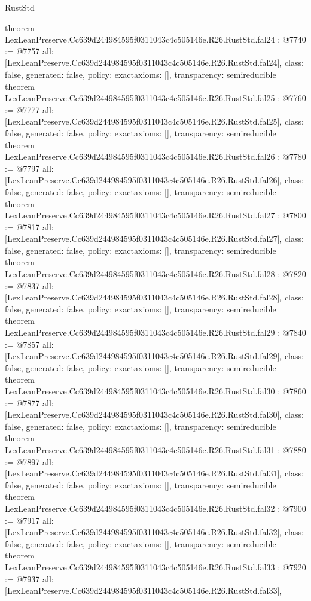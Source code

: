 \begin{lexlean}{RustStd}
\begin{coremodule}
{}
theorem LexLeanPreserve.Cc639d244984595f0311043c4c505146e.R26.RustStd.fal24 : @7740 := @7757 {
  all: [LexLeanPreserve.Cc639d244984595f0311043c4c505146e.R26.RustStd.fal24],
  class: false,
  generated: false,
  policy: exact{axioms: []},
  transparency: semireducible
}
theorem LexLeanPreserve.Cc639d244984595f0311043c4c505146e.R26.RustStd.fal25 : @7760 := @7777 {
  all: [LexLeanPreserve.Cc639d244984595f0311043c4c505146e.R26.RustStd.fal25],
  class: false,
  generated: false,
  policy: exact{axioms: []},
  transparency: semireducible
}
theorem LexLeanPreserve.Cc639d244984595f0311043c4c505146e.R26.RustStd.fal26 : @7780 := @7797 {
  all: [LexLeanPreserve.Cc639d244984595f0311043c4c505146e.R26.RustStd.fal26],
  class: false,
  generated: false,
  policy: exact{axioms: []},
  transparency: semireducible
}
theorem LexLeanPreserve.Cc639d244984595f0311043c4c505146e.R26.RustStd.fal27 : @7800 := @7817 {
  all: [LexLeanPreserve.Cc639d244984595f0311043c4c505146e.R26.RustStd.fal27],
  class: false,
  generated: false,
  policy: exact{axioms: []},
  transparency: semireducible
}
theorem LexLeanPreserve.Cc639d244984595f0311043c4c505146e.R26.RustStd.fal28 : @7820 := @7837 {
  all: [LexLeanPreserve.Cc639d244984595f0311043c4c505146e.R26.RustStd.fal28],
  class: false,
  generated: false,
  policy: exact{axioms: []},
  transparency: semireducible
}
theorem LexLeanPreserve.Cc639d244984595f0311043c4c505146e.R26.RustStd.fal29 : @7840 := @7857 {
  all: [LexLeanPreserve.Cc639d244984595f0311043c4c505146e.R26.RustStd.fal29],
  class: false,
  generated: false,
  policy: exact{axioms: []},
  transparency: semireducible
}
theorem LexLeanPreserve.Cc639d244984595f0311043c4c505146e.R26.RustStd.fal30 : @7860 := @7877 {
  all: [LexLeanPreserve.Cc639d244984595f0311043c4c505146e.R26.RustStd.fal30],
  class: false,
  generated: false,
  policy: exact{axioms: []},
  transparency: semireducible
}
theorem LexLeanPreserve.Cc639d244984595f0311043c4c505146e.R26.RustStd.fal31 : @7880 := @7897 {
  all: [LexLeanPreserve.Cc639d244984595f0311043c4c505146e.R26.RustStd.fal31],
  class: false,
  generated: false,
  policy: exact{axioms: []},
  transparency: semireducible
}
theorem LexLeanPreserve.Cc639d244984595f0311043c4c505146e.R26.RustStd.fal32 : @7900 := @7917 {
  all: [LexLeanPreserve.Cc639d244984595f0311043c4c505146e.R26.RustStd.fal32],
  class: false,
  generated: false,
  policy: exact{axioms: []},
  transparency: semireducible
}
theorem LexLeanPreserve.Cc639d244984595f0311043c4c505146e.R26.RustStd.fal33 : @7920 := @7937 {
  all: [LexLeanPreserve.Cc639d244984595f0311043c4c505146e.R26.RustStd.fal33],
}
\end{coremodule}
\end{lexlean}
